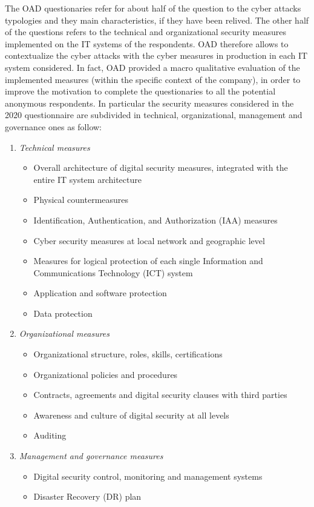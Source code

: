 \documentclass{easychair}
\begin{document}
The OAD questionaries refer for about half of the question to the cyber attacks typologies and they main characteristics, if they have been relived. 
The other half of the questions refers to the technical and organizational security measures implemented on the IT systems of the respondents. 
OAD therefore allows to contextualize the cyber attacks with the cyber measures in production in each IT system considered. 
In fact, OAD provided a macro qualitative evaluation of the implemented measures (within the specific context of the company), in order to improve the motivation to 
complete the questionaries to all the potential anonymous respondents. 
In particular the security measures considered in the 2020 questionnaire are subdivided in technical, organizational, management and governance ones as follow:
\begin{enumerate}
\small
	\item \emph{Technical measures}
	\begin{itemize}
		\item Overall architecture of digital security measures, integrated with the entire IT system architecture
		\item Physical countermeasures
		\item Identification, Authentication, and Authorization (IAA) measures
		\item Cyber security measures at local network and geographic level
		\item Measures for logical protection of each single Information and Communications Technology (ICT) system
		\item Application and software protection
		\item Data protection
	\end{itemize}
	\item \emph{Organizational measures}
	\begin{itemize}
		\item Organizational structure, roles, skills, certifications
		\item Organizational policies and procedures
		\item Contracts, agreements and digital security clauses with third parties
		\item Awareness and culture of digital security at all levels
		\item Auditing
	\end{itemize}
	\item \emph{Management and governance measures}
	\begin{itemize}
		\item Digital security control, monitoring and management systems
		\item Disaster Recovery (DR) plan
	\end{itemize}
\end{enumerate}
\end{document}
